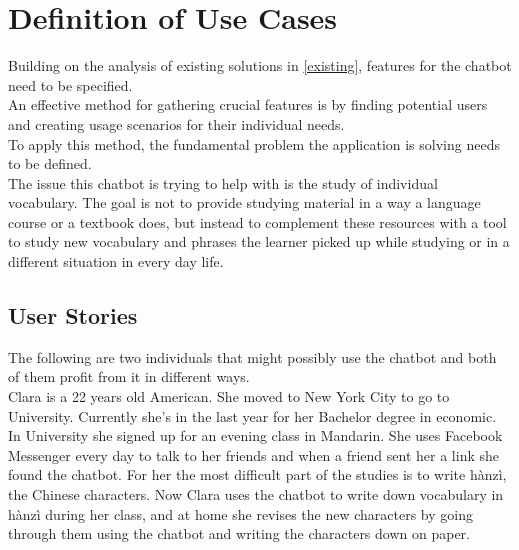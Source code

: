 \section{Definition of Use Cases}

Building on the analysis of existing solutions in \ref{existing}, features for the chatbot need to be specified.
\\
An effective method for gathering crucial features is by finding potential users
and creating usage scenarios for their individual needs.
\\

To apply this method, the fundamental problem the application is solving needs to be defined.
\\
The issue this chatbot is trying to help with is the study of individual vocabulary.
The goal is not to provide studying material in a way a language course or a textbook does,
but instead to complement these resources with a tool to study new vocabulary and phrases the learner picked up
while studying or in a different situation in every day life.
\\


\subsection{User Stories}

The following are two individuals that might possibly use the chatbot and both of them profit from it in different ways.
\\

Clara is a 22 years old American.
She moved to New York City to go to University.
Currently she's in the last year for her Bachelor degree in economic.
In University she signed up for an evening class in Mandarin.
She uses Facebook Messenger every day to talk to her friends and when a friend sent her a link
she found the chatbot.
For her the most difficult part of the studies is to write hànzì, the Chinese characters.
Now Clara uses the chatbot to write down vocabulary in hànzì during her class,
and at home she revises the new characters by going through them using the chatbot and writing the characters
down on paper.
\\

